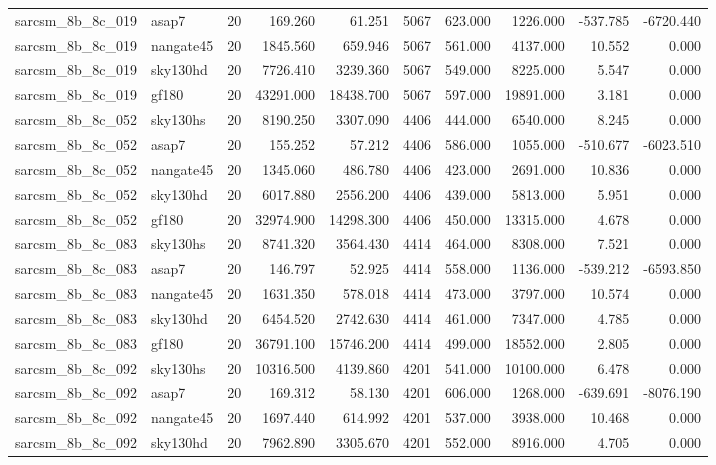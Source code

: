 \documentclass{article}
\begin{document}
\begin{longtable}{llrrrrrrrr}
sarcsm\_8b\_8c\_019 & asap7 & 20 & 169.260 & 61.251 & 5067 & 623.000 & 1226.000 & -537.785 & -6720.440 \\
sarcsm\_8b\_8c\_019 & nangate45 & 20 & 1845.560 & 659.946 & 5067 & 561.000 & 4137.000 & 10.552 & 0.000 \\
sarcsm\_8b\_8c\_019 & sky130hd & 20 & 7726.410 & 3239.360 & 5067 & 549.000 & 8225.000 & 5.547 & 0.000 \\
sarcsm\_8b\_8c\_019 & gf180 & 20 & 43291.000 & 18438.700 & 5067 & 597.000 & 19891.000 & 3.181 & 0.000 \\
sarcsm\_8b\_8c\_052 & sky130hs & 20 & 8190.250 & 3307.090 & 4406 & 444.000 & 6540.000 & 8.245 & 0.000 \\
sarcsm\_8b\_8c\_052 & asap7 & 20 & 155.252 & 57.212 & 4406 & 586.000 & 1055.000 & -510.677 & -6023.510 \\
sarcsm\_8b\_8c\_052 & nangate45 & 20 & 1345.060 & 486.780 & 4406 & 423.000 & 2691.000 & 10.836 & 0.000 \\
sarcsm\_8b\_8c\_052 & sky130hd & 20 & 6017.880 & 2556.200 & 4406 & 439.000 & 5813.000 & 5.951 & 0.000 \\
sarcsm\_8b\_8c\_052 & gf180 & 20 & 32974.900 & 14298.300 & 4406 & 450.000 & 13315.000 & 4.678 & 0.000 \\
sarcsm\_8b\_8c\_083 & sky130hs & 20 & 8741.320 & 3564.430 & 4414 & 464.000 & 8308.000 & 7.521 & 0.000 \\
sarcsm\_8b\_8c\_083 & asap7 & 20 & 146.797 & 52.925 & 4414 & 558.000 & 1136.000 & -539.212 & -6593.850 \\
sarcsm\_8b\_8c\_083 & nangate45 & 20 & 1631.350 & 578.018 & 4414 & 473.000 & 3797.000 & 10.574 & 0.000 \\
sarcsm\_8b\_8c\_083 & sky130hd & 20 & 6454.520 & 2742.630 & 4414 & 461.000 & 7347.000 & 4.785 & 0.000 \\
sarcsm\_8b\_8c\_083 & gf180 & 20 & 36791.100 & 15746.200 & 4414 & 499.000 & 18552.000 & 2.805 & 0.000 \\
sarcsm\_8b\_8c\_092 & sky130hs & 20 & 10316.500 & 4139.860 & 4201 & 541.000 & 10100.000 & 6.478 & 0.000 \\
sarcsm\_8b\_8c\_092 & asap7 & 20 & 169.312 & 58.130 & 4201 & 606.000 & 1268.000 & -639.691 & -8076.190 \\
sarcsm\_8b\_8c\_092 & nangate45 & 20 & 1697.440 & 614.992 & 4201 & 537.000 & 3938.000 & 10.468 & 0.000 \\
sarcsm\_8b\_8c\_092 & sky130hd & 20 & 7962.890 & 3305.670 & 4201 & 552.000 & 8916.000 & 4.705 & 0.000 \\

\end{longtable}
\end{document}
